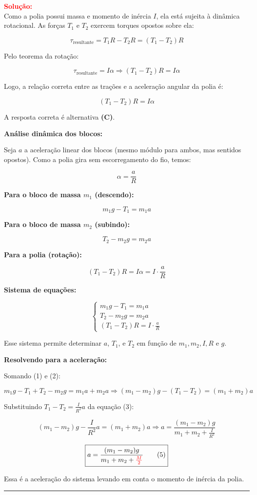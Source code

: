 \begin{flushleft}
\vspace{0.5cm}

\textcolor{red}{\textbf{Solução:}}\\

Como a polia possui massa e momento de inércia \( I \), ela está sujeita à dinâmica rotacional. As forças \( T_1 \) e \( T_2 \) exercem torques opostos sobre ela:

\[
\tau_{\text{resultante}} = T_1 R - T_2 R = (T_1 - T_2)R
\]

Pelo teorema da rotação:

\[
\tau_{\text{resultante}} = I\alpha
\Rightarrow (T_1 - T_2)R = I\alpha
\]

Logo, a relação correta entre as trações e a aceleração angular da polia é:

\[
\boxed{(T_1 - T_2)R = I\alpha}
\]

A resposta correta é alternativa \colorbox{green!50}{\textbf{(C)}}.

\vspace{0.5cm}
\textbf{Análise dinâmica dos blocos:}

Seja \( a \) a aceleração linear dos blocos (mesmo módulo para ambos, mas sentidos opostos). Como a polia gira sem escorregamento do fio, temos:

\[
\alpha = \frac{a}{R}
\]

\textbf{Para o bloco de massa \( m_1 \) (descendo):}

\[
m_1 g - T_1 = m_1 a \tag{1}
\]

\textbf{Para o bloco de massa \( m_2 \) (subindo):}

\[
T_2 - m_2 g = m_2 a \tag{2}
\]

\textbf{Para a polia (rotação):}

\[
(T_1 - T_2)R = I\alpha = I \cdot \frac{a}{R} \tag{3}
\]

\textbf{Sistema de equações:}

\[
\begin{cases}
m_1 g - T_1 = m_1 a \\
T_2 - m_2 g = m_2 a \\
(T_1 - T_2)R = I \cdot \frac{a}{R}
\end{cases}
\]

Esse sistema permite determinar \( a \), \( T_1 \), e \( T_2 \) em função de \( m_1, m_2, I, R \) e \( g \).

\textbf{Resolvendo para a aceleração:}

Somando (1) e (2):

\[
m_1 g - T_1 + T_2 - m_2 g = m_1 a + m_2 a \Rightarrow (m_1 - m_2)g - (T_1 - T_2) = (m_1 + m_2)a \tag{4}
\]

Substituindo \( T_1 - T_2 = \frac{I}{R^2}a \) da equação (3):

\[
(m_1 - m_2)g - \frac{I}{R^2}a = (m_1 + m_2)a
\Rightarrow a = \frac{(m_1 - m_2)g}{m_1 + m_2 + \frac{I}{R^2}} \tag{5}
\]

\[
\boxed{
a = \frac{(m_1 - m_2)g}{m_1 + m_2 + \textcolor{red}{\frac{M}{2}}} \tag{5}
}
\]

Essa é a aceleração do sistema levando em conta o momento de inércia da polia.


\end{flushleft}

\noindent\rule{\linewidth}{0.6pt}\\